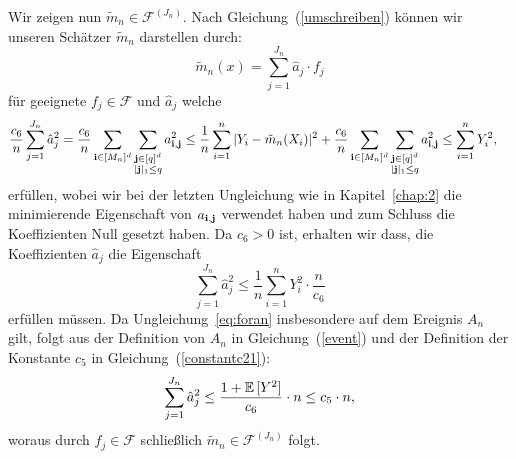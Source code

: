 {Wir zeigen nun $\tilde{m}_n \in \mathcal{F}^{(J_n)}$.
Nach Gleichung~(\ref{umschreiben}) können wir unseren Schätzer $\tilde{m}_n$ darstellen durch:
$$\tilde{m}_n(x) = \sum_{j = 1}^{J_n}\hat{a}_j \cdot f_j$$
für geeignete $f_j \in \mathcal{F}$ und $\hat{a}_j$ welche 
\begin{equation*}
\begin{split}
\frac{c_6}{n}\sum_{j = 1}^{J_n} \hat{a}_j^2 & = \frac{c_6}{n} \sum_{\mathbf{i} \in [M_n]^d} \sum_{\substack{\mathbf{j} \in [q]^d \\ |\mathbf{j}|_1 \leq q}} a_{\mathbf{i},\mathbf{j}}^2
\leq \frac{1}{n} \sum_{i = 1}^n|Y_i - \tilde{m}_n(X_i)|^2 + \frac{c_6}{n} \sum_{\mathbf{i} \in [M_n]^d} \sum_{\substack{\mathbf{j} \in [q]^d \\ |\mathbf{j}|_1 \leq q}} a_{\mathbf{i},\mathbf{j}}^2 
\leq \sum_{i = 1}^n Y_i^2,
\end{split}
\end{equation*}
erfüllen, wobei wir bei der letzten Ungleichung wie in Kapitel~\ref{chap:2} die minimierende Eigenschaft von $a_{\mathbf{i},\mathbf{j}}$ verwendet haben und zum Schluss die Koeffizienten Null gesetzt haben. Da $c_6 > 0$ ist, erhalten wir dass, die Koeffizienten $\hat{a}_j$ die Eigenschaft
\begin{equation}
\label{eq:foran}
\sum_{j = 1}^{J_n} \hat{a}_j^2  \leq \frac{1}{n}\sum_{i = 1}^n Y_i^2 \cdot \frac{n}{c_6}
\end{equation}
erfüllen müssen.
Da Ungleichung~\ref{eq:foran} insbesondere auf dem Ereignis $A_n$ gilt, folgt aus der Definition von $A_n$ in Gleichung~(\ref{event}) und der Definition der Konstante $c_5$ in Gleichung~(\ref{constantc21}):
$$\sum_{j = 1}^{J_n}\hat{a}_j^2 \leq \frac{1 + \mathbb{E}\,[Y^2]}{c_6} \cdot n \leq c_5 \cdot n,$$
woraus durch $f_j \in \mathcal{F}$ schließlich $\tilde{m}_n \in \mathcal{F}^{(J_n)}$ folgt.

}
